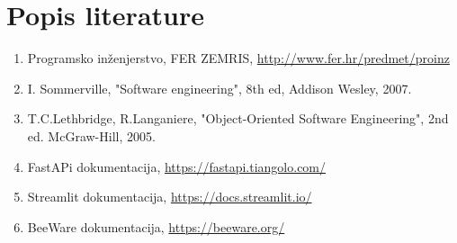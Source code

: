 \chapter*{Popis literature}


		\begin{enumerate}


			\item  Programsko inženjerstvo, FER ZEMRIS, \url{http://www.fer.hr/predmet/proinz}

			\item  I. Sommerville, "Software engineering", 8th ed, Addison Wesley, 2007.

			\item  T.C.Lethbridge, R.Langaniere, "Object-Oriented Software Engineering", 2nd ed. McGraw-Hill, 2005.

			\item  FastAPi dokumentacija, \url{https://fastapi.tiangolo.com/}

			\item  Streamlit dokumentacija, \url{https://docs.streamlit.io/}

			\item  BeeWare dokumentacija, \url{https://beeware.org/}

		\end{enumerate}
